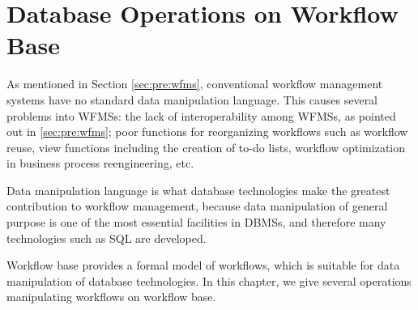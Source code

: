 
\newcommand{\ancestor}{\mathop{\rm ancestor}\nolimits}
\newcommand{\descendant}{\mathop{\rm descendant}\nolimits}
\newcommand{\wft}{\mathop{\rm wft}\nolimits}
\newcommand{\wfi}{\mathop{\rm wfi}\nolimits}
\newcommand{\wftgeneral}{\mathop{\rm general}\nolimits}
\newcommand{\wftspecial}{\mathop{\rm special}\nolimits}
\newcommand{\evalexp}{\mathop{\rm eval}\nolimits}

\newcommand{\selectao}{\mathop{\sigma}}
\newcommand{\selectwft}{\mathop{\sigma'}}
\newcommand{\getworkflow}{\mathop{\eta}}
\newcommand{\wfbhide}{\mathop{\psi}}
\newcommand{\wfbshow}{\mathop{\Psi}}
\newcommand{\wfbgeneral}{\mathop{\vartheta}}
\newcommand{\wfbspecial}{\mathop{\Theta}}
\newcommand{\wfbancestor}{\mathop{\vartheta^+}}
\newcommand{\wfbdescendant}{\mathop{\Theta^+}}
\newcommand{\wfbgrouping}{\mathop{\omega}}
\newcommand{\wfbflatten}{\mathop{\Omega}}
\newcommand{\wfbsplit}{\mathop{\gamma}}
\newcommand{\wfbconcat}{\mathop{\Gamma}}
\newcommand{\wfbplugin}{\mathop{\Join^+}}
\newcommand{\wfbplugout}{\mathop{\pi^+}}

\chapter{Database Operations on Workflow Base}
\label{chap:dbop}

As mentioned in Section \ref{sec:pre:wfms}, conventional workflow
management systems have no standard data manipulation language.
This causes several problems into WFMSs: the lack of interoperability
among WFMSs, as pointed out in \ref{sec:pre:wfms}; poor functions for
reorganizing workflows such as workflow reuse, view functions
including the creation of to-do lists, workflow optimization in business 
process reengineering, etc.

Data manipulation language is what database technologies make the
greatest contribution to workflow management, because data manipulation
of general purpose is one of the most essential facilities in DBMSs, and 
therefore many technologies such as SQL are developed.

Workflow base provides a formal model of workflows, which is suitable
for data manipulation of database technologies.  In this chapter, we
give several operations manipulating workflows on workflow base.

